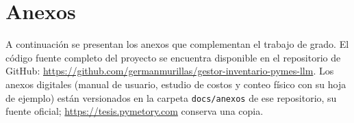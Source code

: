 \documentclass[letterpaper, 11pt, oneside]{book}
\begin{document}




\chapter*{Anexos}
\setcounter{figure}{0}\setcounter{table}{0}

A continuación se presentan los anexos que complementan el trabajo de grado. El código fuente completo del proyecto se encuentra disponible en el repositorio de GitHub: \url{https://github.com/germanmurillas/gestor-inventario-pymes-llm}. Los anexos digitales (manual de usuario, estudio de costos y conteo físico con su hoja de ejemplo) están versionados en la carpeta \texttt{docs/anexos} de ese repositorio, su fuente oficial; \url{https://tesis.pymetory.com} conserva una copia.





\end{document}
